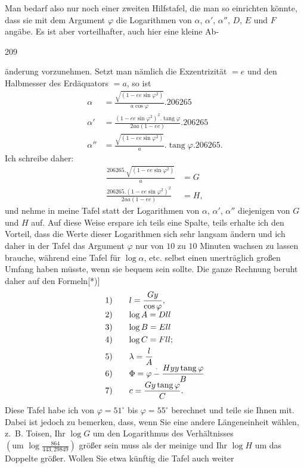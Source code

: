 Man bedarf also nur noch einer zweiten Hilfstafel, die man so einrichten könnte, dass sie mit dem Argument $\varphi$ die Logarithmen von $\alpha$, $\alpha'$, $\alpha''$, $D$, $E$ und $F$ angäbe. Es ist aber vorteilhafter, auch hier eine kleine Ab-\par
\clearpage
{}\hfill209\par\medskip
\noindent änderung vorzunehmen. Setzt man nämlich die Exzentrizität $=e$ und den Halbmesser des Erdäquators $=a$, so ist
\[
\begin{aligned}
\alpha&=\frac{\sqrt{(1-ee\sin\varphi^2)}}{a\cos\varphi}.206265\\
\alpha'&=\frac{(1-ee\sin\varphi^2)^2.\operatorname{tang}\varphi}{2aa(1-ee)}.206265\\
\alpha''&=\frac{\sqrt{(1-ee\sin\varphi^2)}}a.\operatorname{tang}\varphi.206265.
\end{aligned}
\]
Ich schreibe daher:
\[
\begin{aligned}
\frac{206265.\sqrt{(1-ee\sin\varphi^2)}}a&=G\\
\frac{206265.(1-ee\sin\varphi^2)^2}{2aa(1-ee)}&=H,
\end{aligned}
\]
und nehme in meine Tafel statt der Logarithmen von $\alpha$, $\alpha'$, $\alpha''$ diejenigen von $G$ und $H$ auf. Auf diese Weise erspare ich teils eine Spalte, teils erhalte ich den Vorteil, dass die Werte dieser Logarithmen sich sehr langsam ändern und ich daher in der Tafel das Argument $\varphi$ nur von $10$ zu $10$ Minuten wachsen zu lassen brauche, während eine Tafel für $\log\alpha$, etc. selbst einen unerträglich großen Umfang haben müsste, wenn sie bequem sein sollte. Die ganze Rechnung beruht daher auf den Formeln[*)]
\[
\begin{array}{r@{\qquad}l}
1)&\displaystyle l=\frac{Gy}{\cos\varphi},\\[3pt]
2)&\log A=Dll\\[3pt]
3)&\log B=Ell\\[3pt]
4)&\log C=Fll;\\[3pt]
5)&\displaystyle\lambda=\frac lA\\[3pt]
6)&\displaystyle\Phi=\varphi\mathbin{\overset{\raisebox{.15ex}{\scriptsize.}}{-}}\frac{Hyy\operatorname{tang}\varphi}{B}\\[3pt]
7)&\displaystyle c=\frac{Gy\operatorname{tang}\varphi}{C}.
\end{array}
\]
Diese Tafel habe ich von $\varphi=51^\circ$ bis $\varphi=55^\circ$ berechnet und teile sie Ihnen mit. Dabei ist jedoch zu bemerken, dass, wenn Sie eine andere Längeneinheit wählen, z.~B. Toisen, Ihr $\log G$ um den Logarithmus des Verhältnisses $\left(\text{um }\log\frac{864}{443{,}29849}\right)$ größer sein muss als der meinige und Ihr $\log H$ um das Doppelte größer. Wollen Sie etwa künftig die Tafel auch weiter
